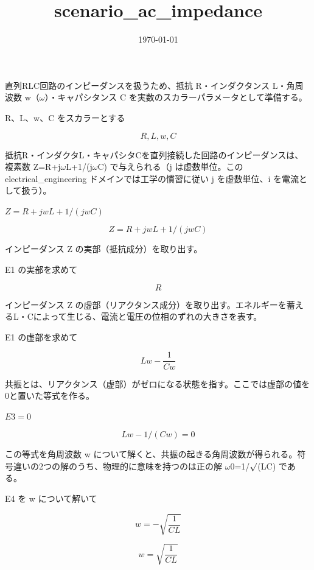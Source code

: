 \documentclass[dvipdfmx,a4paper,11pt]{jsarticle}
\title{scenario\_ac\_impedance}
\date{\today}
\begin{document}
\maketitle

直列RLC回路のインピーダンスを扱うため、抵抗 R・インダクタンス L・角周波数 w（$\omega$）・キャパシタンス C を実数のスカラーパラメータとして準備する。

R、L、w、C をスカラーとする

\[
  R, L, w, C
\]

抵抗R・インダクタL・キャパシタCを直列接続した回路のインピーダンスは、複素数 Z=R+j$\omega$L+1/(j$\omega$C) で与えられる（j は虚数単位。この electrical\_engineering ドメインでは工学の慣習に従い j を虚数単位、i を電流として扱う）。

$Z = R + j w L + 1/(j w C)$

\begin{equation}
  Z = R + j w L + 1/(j w C)
  \label{eq:E1}
\end{equation}

インピーダンス Z の実部（抵抗成分）を取り出す。

E1 の実部を求めて

\begin{equation}
  R
  \label{eq:E2}
\end{equation}

インピーダンス Z の虚部（リアクタンス成分）を取り出す。エネルギーを蓄えるL・Cによって生じる、電流と電圧の位相のずれの大きさを表す。

E1 の虚部を求めて

\begin{equation}
  L w-\frac{1}{C w}
  \label{eq:E3}
\end{equation}

共振とは、リアクタンス（虚部）がゼロになる状態を指す。ここでは虚部の値を0と置いた等式を作る。

$E3 = 0$

\begin{equation}
  L w-1/(C w) = 0
  \label{eq:E4}
\end{equation}

この等式を角周波数 w について解くと、共振の起きる角周波数が得られる。符号違いの2つの解のうち、物理的に意味を持つのは正の解 $\omega$0=1/$\surd$(LC) である。

E4 を w について解いて

\begin{equation}
  w = -\sqrt{\frac{1}{C L}}
  \label{eq:E5}
\end{equation}

\begin{equation}
  w = \sqrt{\frac{1}{C L}}
  \label{eq:E6}
\end{equation}
\end{document}
